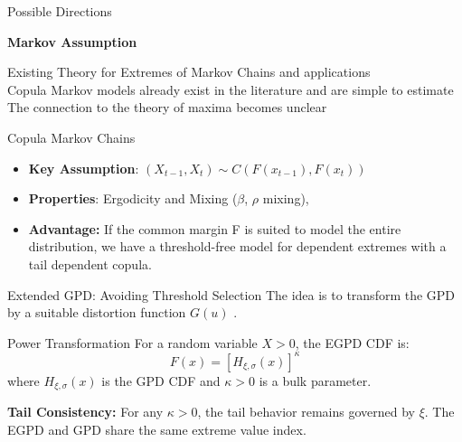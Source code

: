 \documentclass[10pt, aspectratio=169]{beamer}
\begin{document}
\begin{frame}{Possible Directions}
{\begin{minipage}[t]{0.48\textwidth}
\end{minipage}
\hfill
\begin{minipage}[t]{0.48\textwidth}

{\Large \textbf{Markov Assumption}}

\vspace{0.3cm}

\begin{flushleft}
  \textcolor{green!60!black}{\checkmark} Existing Theory for Extremes of Markov Chains and applications \parencite{drees2015, winter2016} \\
   \textcolor{green!60!black}{\checkmark} Copula Markov models already exist in the literature and are simple to estimate \\
   \textcolor{red!70!black}{\texttimes} The connection to the theory of maxima becomes unclear
\end{flushleft}

\end{minipage}
}

\end{frame}

\begin{frame}{Copula Markov Chains}
  \begin{itemize}
    \item \textbf{Key Assumption}: $(X_{t-1}, X_t) \sim C(F(x_{t-1}), F(x_t))$
    \item \textbf{Properties}: Ergodicity and Mixing ($\beta$, $\rho$ mixing), \parencite{chen2009,longla2012}
    \item \textbf{Advantage:} If the common margin F is suited to model the entire distribution, we have a \alert{threshold-free} model for dependent extremes with a \alert{tail dependent} copula.
  \end{itemize}
\end{frame}

\begin{frame}{Extended GPD: Avoiding Threshold Selection}
    The idea is to transform the GPD by a suitable distortion function $G(u)$ \parencite{naveau2016}. \pause

    \begin{block}{Power Transformation}
      \vspace{0.1cm}
        For a random variable $X > 0$, the EGPD CDF is:
        \[
        F(x) = \left[ H_{\xi, \sigma}(x) \right]^\kappa
        \]
        where $H_{\xi, \sigma}(x)$ is the GPD CDF and \alert{$\kappa > 0$} is a bulk parameter.
    \end{block} \pause

    \textbf{Tail Consistency:} For any $\kappa > 0$, the tail behavior remains governed by $\xi$. The EGPD and GPD share the \alert{same extreme value index}.
\end{frame}
\end{document}

